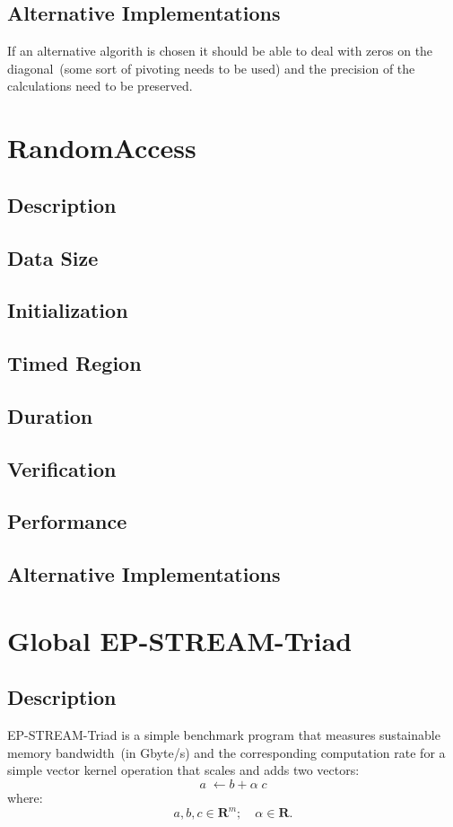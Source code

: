 \documentclass[twocolumn,draft]{article}
\newcommand{\RANDA}{\textsf{RandomAccess}\xspace}
\newcommand{\STREAM}{\textsf{STREAM}\xspace}
\begin{document}
\subsection{Alternative Implementations}
If an alternative algorith is chosen it should be able to deal with zeros on
the diagonal~(some sort of pivoting needs to be used) and the precision of the
calculations need to be preserved.

\section{\RANDA}
\subsection{Description}
\subsection{Data Size}
\subsection{Initialization}
\subsection{Timed Region}
\subsection{Duration}
\subsection{Verification}
\subsection{Performance}
\subsection{Alternative Implementations}

\section{Global EP-\STREAM{}-Triad}
\subsection{Description}
EP-\STREAM{}-Triad is a simple benchmark program that measures sustainable
memory bandwidth~(in Gbyte/s) and the corresponding computation rate for
a simple vector kernel operation that scales and adds two vectors:
\begin{equation}
a\;\leftarrow b+\alpha\;c
\label{eqn:striad}
\end{equation}
where:
\[a, b, c\in\mathbf{R}^m; \quad \alpha\in\mathbf{R}.\]
\end{document}
